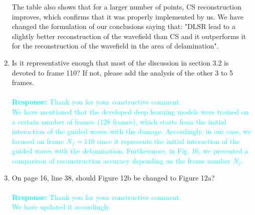 \documentclass[11pt,a2paper]{report}
\begin{document}
\begin{enumerate}
{			The table also shows that for a larger number of points, CS reconstruction improves, which confirms that it was properly implemented by us.  
			We have changed the formulation of our conclusions saying that: "DLSR lead to a slightly better reconstruction of the wavefield than CS and it outperforms it for the reconstruction of the wavefield in the area of delamination".
		}
		\item Is it representative enough that most of the discussion in section 3.2 is devoted to frame 110? If not, please add the analysis of the other 3 to 5 frames.
		\\ \\ 
		\textcolor{Cyan}
		{
			\textbf{Response:}
			Thank you for your constructive comment. \\
			We have mentioned that the developed deep learning models were trained on a certain number of frames (128 frames), which starts from the initial interaction of the guided waves with the damage.
			Accordingly, in our case, we focused on frame $N_f =110$ since it represents the initial interaction of the guided waves with the delamination.
			Furthermore, in Fig. 16, we presented a comparison of reconstruction accuracy depending on the frame number $N_f$.
		}
		\item On page 16, line 38, should Figure 12b be changed to Figure 12a?
		\\ \\ 
		\textcolor{Cyan}
		{
			\textbf{Response:}
			Thank you for your constructive comment. 
			\\
			We have updated it accordingly.
		}
	\end{enumerate}
\end{document}
